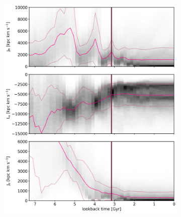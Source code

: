 \begin{figure}[htbp]
\captionsetup{format=plain}
    \begin{subfigure}[c]{0.48\textwidth}
    \centering
    	\includegraphics[width=\textwidth]{plots/Dynamics/prog2/action_time_evolution_wodisk_hist_mean.png}
    \end{subfigure}
    ~
    \begin{subfigure}[c]{0.48\textwidth}
    \centering

\end{subfigure}
\end{figure}
